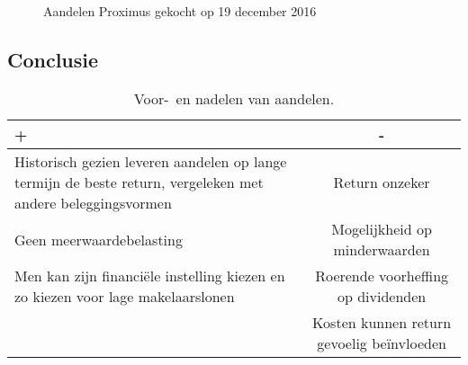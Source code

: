 \begin{comment}

Altijd onderbouwen bij elk product:
\begin{enumerate}
	\item \textbf{waarom} heb je dit product gekozen?
	\item wat is de \textbf{veiligheid} van dit product?
	\item wat is de \textbf{liquiditeit} van dit product?
	\item wat is de \textbf{return} van dit product?
	\item wat is de \textbf{fiscaliteit} van dit product?
	\item wat zijn de \textbf{kosten} van dit product?
\end{enumerate}
\end{comment}
\
\begin{figure}[tbph!]
	\centering
	\caption[Aandelen Proximus]{Aandelen Proximus gekocht op 19 december 2016}
	\label{fig:aandelenproximusgekocht19december2016}
\end{figure}


\subsection{Conclusie}

\begin{table}[!htbp]
	\centering
		\begin{tabular}{p{10cm}|c}
			\toprule
			
			 \cellcolor{lightgray}            +              &  \cellcolor{lightgray}                                      -                                        \\ \midrule
			 Historisch gezien leveren aandelen op lange termijn de beste return, vergeleken met andere beleggingsvormen   & Return onzeker          \\ \hline
			  Geen meerwaardebelasting  & Mogelijkheid op minderwaarden \\ \hline
			Men kan zijn financiële instelling kiezen en zo kiezen voor lage makelaarslonen & Roerende voorheffing op dividenden \\ \hline
			       & Kosten kunnen return gevoelig beïnvloeden  \\ \bottomrule
		\end{tabular}
	\caption{Voor-~en nadelen van aandelen.}
	\label{tab:voordelenennadelenaandelen}
\end{table}

